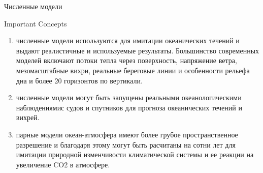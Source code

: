 \begin{chapter}{Численные модели}
\begin{section}{Important Concepts}
\begin{enumerate}
\item
численные модели используются для имитации океанических течений и
выдают реалистичные и используемые результаты. Большинство современных
моделей включают потоки тепла через поверхность, напряжение ветра,
мезомасштабные вихри, реальные береговые линии и особенности рельефа
дна и более 20 горизонтов по вертикали.

\item
численные модели могут быть запущены реальными океанологическими
наблюдениямис судов и спутников для прогноза океанических течений и
вихрей.
%

\item
парные модели океан-атмосфера имеют более грубое пространственное
разрешение и благодаря этому могут быть расчитаны на сотни лет для
имитации природной изменчивости климатической системы и ее реакции на
увеличение CO2 в атмосфере.
%
\end{enumerate}
\end{section}

\end{chapter}